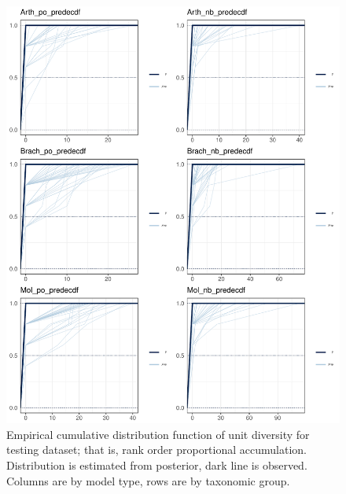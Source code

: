 \documentclass[12pt,letterpaper]{article}
\begin{document}
\afterpage{\clearpage}
\begin{figure}[h]
  \centering
  \includegraphics[width=\textwidth,height=0.8\textheight,keepaspectratio=true]{figure/pred_ecdf}
  \caption{Empirical cumulative distribution function of unit diversity for testing dataset; that is, rank order proportional accumulation. Distribution is estimated from posterior, dark line is observed. Columns are by model type, rows are by taxonomic group.}
  \label{fig:pred_ecdf}
\end{figure}
\end{document}
